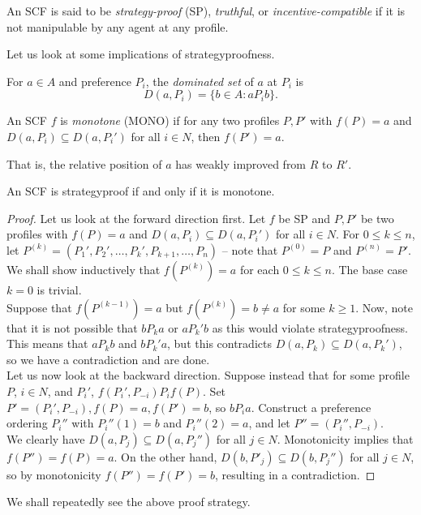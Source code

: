 	\begin{fdef}[Strategyproofness]
		An SCF is said to be \emph{strategy-proof} (SP), \emph{truthful}, or \emph{incentive-compatible} if it is not manipulable by any agent at any profile.
	\end{fdef}

	Let us look at some implications of strategyproofness.

	\begin{fdef}
		For $a \in A$ and preference $P_i$, the \emph{dominated set} of $a$ at $P_i$ is
		\[ D(a,P_i) = \{ b \in A : a P_i b \}. \]
	\end{fdef}

	\begin{fdef}[Monotonicity]
		An SCF $f$ is \emph{monotone} (MONO) if for any two profiles $P,P'$ with $f(P) = a$ and $D(a,P_i) \subseteq D(a,P_i')$ for all $i \in N$, then $f(P') = a$.
	\end{fdef}
	That is, the relative position of $a$ has weakly improved from $R$ to $R'$.

	\begin{flem}
		An SCF is strategyproof if and only if it is monotone.
	\end{flem}
	\begin{proof}
		Let us look at the forward direction first. Let $f$ be SP and $P,P'$ be two profiles with $f(P) = a$ and $D(a,P_i) \subseteq D(a,P_i')$ for all $i \in N$. For $0 \le k \le n$, let $P^{(k)} = (P_1',P_2',\ldots,P_k',P_{k+1},\ldots,P_n)$ -- note that $P^{(0)} = P$ and $P^{(n)} = P'$. We shall show inductively that $f(P^{(k)}) = a$ for each $0 \le k \le n$. The base case $k = 0$ is trivial.\\
		Suppose that $f(P^{(k-1)}) = a$ but $f(P^{(k)}) = b \ne a$ for some $k \ge 1$.
		Now, note that it is not possible that $b P_k a$ or $a P_k' b$ as this would violate strategyproofness. This means that $a P_k b$ and $b P_k' a$, but this contradicts $D(a,P_k) \subseteq D(a,P_k')$, so we have a contradiction and are done.\\

		Let us now look at the backward direction. Suppose instead that for some profile $P$, $i \in N$, and $P_i'$, $f(P_i',P_{-i}) P_i f(P)$. Set $P' = (P_i',P_{-i}), f(P) = a, f(P') = b$, so $b P_i a$. Construct a preference ordering $P_i''$ with $P_i''(1) = b$ and $P_i''(2) = a$, and let $P'' = (P_i'',P_{-i})$.\\
		We clearly have $D(a,P_j) \subseteq D(a,P_j'')$ for all $j \in N$. Monotonicity implies that $f(P'') = f(P) = a$. On the other hand, $D(b,P'_j) \subseteq D(b,P_j'')$ for all $j \in N$, so by monotonicity $f(P'') = f(P') = b$, resulting in a contradiction.
	\end{proof}
	We shall repeatedly see the above proof strategy.

